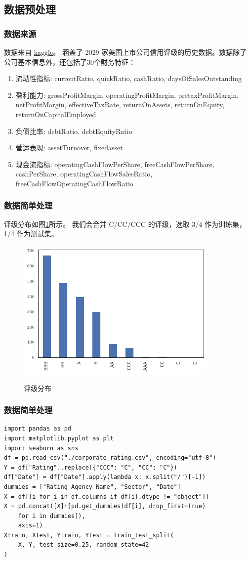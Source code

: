 \subsection{数据预处理}
\begin{frame}
    \frametitle{数据来源}
    数据来自 \href{https://www.kaggle.com/datasets/agewerc/corporate-credit-rating}{kaggle}。
    涵盖了 2029 家美国上市公司信用评级的历史数据。数据除了公司基本信息外，还包括了30个财务特征：

    \begin{enumerate}
        \item 流动性指标: currentRatio, quickRatio, cashRatio, daysOfSalesOutstanding
        \item 盈利能力: grossProfitMargin, operatingProfitMargin, pretaxProfitMargin, netProfitMargin, effectiveTaxRate, returnOnAssets, returnOnEquity, returnOnCapitalEmployed
        \item 负债比率: debtRatio, debtEquityRatio
        \item 营运表现: assetTurnover, fixedasset
        \item 现金流指标: operatingCashFlowPerShare, freeCashFlowPerShare, cashPerShare, operatingCashFlowSalesRatio, freeCashFlowOperatingCashFlowRatio
    \end{enumerate}
\end{frame}
\begin{frame}[fragile]
    \frametitle{数据简单处理}
    评级分布如图\ref{rating}所示。
    我们会合并 C/CC/CCC 的评级，选取 3/4 作为训练集，1/4 作为测试集。
    \begin{figure}
        \includegraphics[width=0.6\linewidth]{../lib/rating.png}
        \label{rating}
        \caption{评级分布}
    \end{figure}
\end{frame}
\begin{frame}[fragile]
    \frametitle{数据简单处理}
    \begin{verbatim}
import pandas as pd
import matplotlib.pyplot as plt
import seaborn as sns
df = pd.read_csv("./corporate_rating.csv", encoding="utf-8")
Y = df["Rating"].replace({"CCC": "C", "CC": "C"})
df["Date"] = df["Date"].apply(lambda x: x.split("/")[-1])
dummies = ["Rating Agency Name", "Sector", "Date"]
X = df[[i for i in df.columns if df[i].dtype != "object"]]
X = pd.concat([X]+[pd.get_dummies(df[i], drop_first=True)
    for i in dummies]),
    axis=1)
Xtrain, Xtest, Ytrain, Ytest = train_test_split(
    X, Y, test_size=0.25, random_state=42
)
\end{verbatim}
\end{frame}
